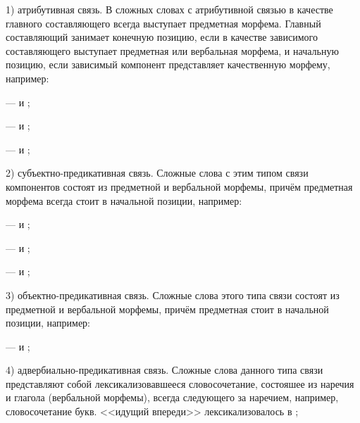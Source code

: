 1) атрибутивная связь. В сложных словах с атрибутивной связью в качестве главного составляющего всегда выступает предметная морфема. Главный составляющий занимает конечную позицию, если в качестве зависимого составляющего выступает предметная или вербальная морфема, и начальную позицию, если зависимый компонент представляет качественную морфему, например: 
\begin{prfsample}
    \item {} ---  и ;
    \item {} ---  и ;
    \item {} ---  и ;
\end{prfsample}

2) субъектно-предикативная связь. Сложные слова с этим типом связи компонентов состоят из предметной и вербальной морфемы, причём предметная морфема всегда стоит в начальной позиции, например:
\begin{prfsample}
    \item {} ---  и ;
    \item {} ---  и ;
    \item {} ---  и ;
\end{prfsample}

3) объектно-предикативная связь. Сложные слова этого типа связи состоят из предметной и вербальной морфемы, причём предметная стоит в начальной позиции, например:
\begin{prfsample}
    \item {} ---  и ;    
\end{prfsample}

4) адвербиально-предикативная связь. Сложные слова данного типа связи представляют собой лексикализовавшееся словосочетание, состояшее из наречия и глагола (вербальной морфемы), всегда следующего за наречием, например, словосочетание  букв. <<идущий впереди>> лексикализовалось в ;

